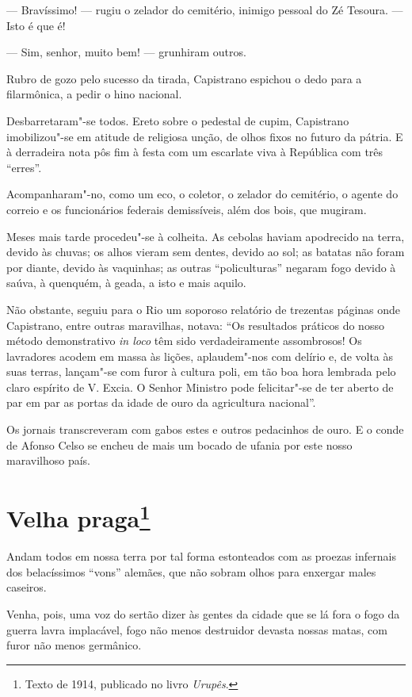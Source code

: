 --- Bravíssimo! --- rugiu o zelador do cemitério, inimigo pessoal do Zé
Tesoura. --- Isto é que é!

--- Sim, senhor, muito bem! --- grunhiram outros.

Rubro de gozo pelo sucesso da tirada, Capistrano espichou o dedo para a
filarmônica, a pedir o hino nacional.

Desbarretaram"-se todos. Ereto sobre o pedestal de cupim, Capistrano
imobilizou"-se em atitude de religiosa unção, de olhos fixos no futuro da
pátria. E à derradeira nota pôs fim à festa com um escarlate viva à
República com três ``erres''.

Acompanharam"-no, como um eco, o coletor, o zelador do cemitério, o
agente do correio e os funcionários federais demissíveis, além dos bois,
que mugiram.

Meses mais tarde procedeu"-se à colheita. As cebolas haviam apodrecido na
terra, devido às chuvas; os alhos vieram sem dentes, devido ao sol; as
batatas não foram por diante, devido às vaquinhas; as outras
``policulturas'' negaram fogo devido à saúva, à quenquém, à geada, a
isto e mais aquilo.

Não obstante, seguiu para o Rio um soporoso relatório de trezentas
páginas onde Capistrano, entre outras maravilhas, notava: ``Os
resultados práticos do nosso método demonstrativo \emph{in loco} têm
sido verdadeiramente assombrosos! Os lavradores acodem em massa às
lições, aplaudem"-nos com delírio e, de volta às suas terras, lançam"-se
com furor à cultura poli, em tão boa hora lembrada pelo claro espírito
de V. Excia. O Senhor Ministro pode felicitar"-se de ter aberto de par em
par as portas da idade de ouro da agricultura nacional''.

Os jornais transcreveram com gabos estes e outros pedacinhos de ouro. E
o conde de Afonso Celso se encheu de mais um bocado de ufania por este
nosso maravilhoso país.

\chapter{Velha praga\footnote[*]{Texto de 1914, publicado no livro \emph{Urupês}.}}

Andam todos em nossa terra por tal forma estonteados com as proezas
infernais dos belacíssimos ``vons'' alemães, que não sobram olhos para
enxergar males caseiros.

Venha, pois, uma voz do sertão dizer às gentes da cidade que se lá fora
o fogo da guerra lavra implacável, fogo não menos destruidor devasta
nossas matas, com furor não menos germânico.

